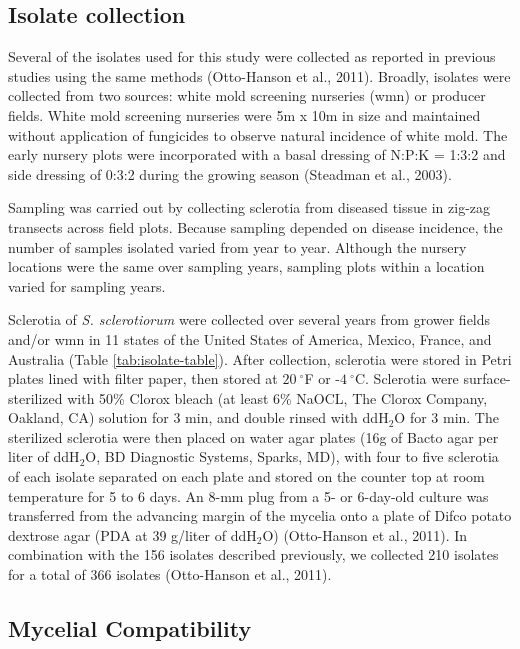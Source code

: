 \documentclass[fleqn,10pt,lineno]{wlpeerj} %
\theoremstyle{definition}
\theoremstyle{definition}
\theoremstyle{definition}
\theoremstyle{remark}
\begin{document}
\subsection*{Isolate collection}\label{isolate-collection}

Several of the isolates used for this study were collected as reported
in previous studies using the same methods (Otto-Hanson et al., 2011).
Broadly, isolates were collected from two sources: white mold screening
nurseries (wmn) or producer fields. White mold screening nurseries were
5m x 10m in size and maintained without application of fungicides to
observe natural incidence of white mold. The early nursery plots were
incorporated with a basal dressing of N:P:K = 1:3:2 and side dressing of
0:3:2 during the growing season (Steadman et al., 2003).

Sampling was carried out by collecting sclerotia from diseased tissue in
zig-zag transects across field plots. Because sampling depended on
disease incidence, the number of samples isolated varied from year to
year. Although the nursery locations were the same over sampling years,
sampling plots within a location varied for sampling years.

Sclerotia of \emph{S. sclerotiorum} were collected over several years
from grower fields and/or wmn in 11 states of the United States of
America, Mexico, France, and Australia (Table \ref{tab:isolate-table}).
After collection, sclerotia were stored in Petri plates lined with
filter paper, then stored at \(20~^{\circ}\)F or -\(4~^{\circ}\)C.
Sclerotia were surface-sterilized with 50\% Clorox bleach (at least 6\%
NaOCL, The Clorox Company, Oakland, CA) solution for 3 min, and double
rinsed with ddH\(_2\)O for 3 min. The sterilized sclerotia were then
placed on water agar plates (16g of Bacto agar per liter of ddH\(_2\)O,
BD Diagnostic Systems, Sparks, MD), with four to five sclerotia of each
isolate separated on each plate and stored on the counter top at room
temperature for 5 to 6 days. An 8-mm plug from a 5- or 6-day-old culture
was transferred from the advancing margin of the mycelia onto a plate of
Difco potato dextrose agar (PDA at 39 g/liter of ddH\(_2\)O)
(Otto-Hanson et al., 2011). In combination with the 156 isolates
described previously, we collected 210 isolates for a total of 366
isolates (Otto-Hanson et al., 2011).

\subsection*{Mycelial Compatibility}\label{mycelial-compatibility}
\end{document}

